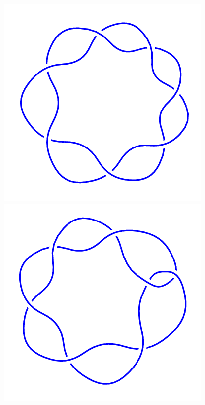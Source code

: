 \begin{figure}[H]
\begin{minipage}[b]{.18\linewidth}
    \end{minipage}
    \begin{minipage}[b]{.18\linewidth}
        \centering
        \includegraphics[width=\linewidth]{../data/7_1.png}
    \end{minipage}
    \begin{minipage}[b]{.18\linewidth}
        \centering
        \includegraphics[width=\linewidth]{../data/7_2.png}

\end{minipage}
\end{figure}
